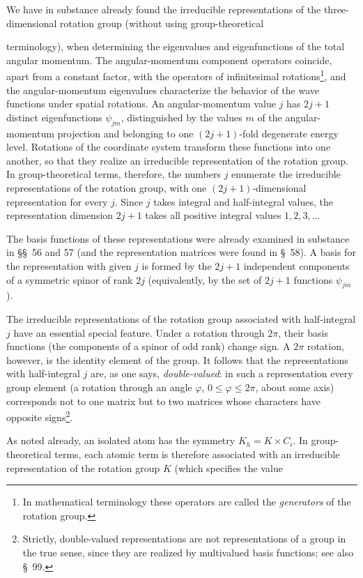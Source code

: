 We have in substance already found the irreducible representations of the three-dimensional rotation group (without using group-theoretical

terminology), when determining the eigenvalues and eigenfunctions of the total angular momentum. The angular-momentum component operators coincide, apart from a constant factor, with the operators of infinitesimal rotations\footnote{In mathematical terminology these operators are called the \emph{generators} of the rotation group.}, and the angular-momentum eigenvalues characterize the behavior of the wave functions under spatial rotations. An angular-momentum value $j$ has $2j+1$ distinct eigenfunctions $\psi_{jm}$, distinguished by the values $m$ of the angular-momentum projection and belonging to one $(2j+1)$-fold degenerate energy level. Rotations of the coordinate system transform these functions into one another, so that they realize an irreducible representation of the rotation group. In group-theoretical terms, therefore, the numbers $j$ enumerate the irreducible representations of the rotation group, with one $(2j+1)$-dimensional representation for every $j$. Since $j$ takes integral and half-integral values, the representation dimension $2j+1$ takes all positive integral values $1,2,3,\ldots$

The basis functions of these representations were already examined in substance in \S\S~56 and 57 (and the representation matrices were found in \S~58). A basis for the representation with given $j$ is formed by the $2j+1$ independent components of a symmetric spinor of rank $2j$ (equivalently, by the set of $2j+1$ functions $\psi_{jm}$).

The irreducible representations of the rotation group associated with half-integral $j$ have an essential special feature. Under a rotation through $2\pi$, their basis functions (the components of a spinor of odd rank) change sign. A $2\pi$ rotation, however, is the identity element of the group. It follows that the representations with half-integral $j$ are, as one says, \emph{double-valued}: in such a representation every group element (a rotation through an angle $\varphi$, $0\leqslant\varphi\leqslant2\pi$, about some axis) corresponds not to one matrix but to two matrices whose characters have opposite signs\footnote{Strictly, double-valued representations are not representations of a group in the true sense, since they are realized by multivalued basis functions; see also \S~99.}.

As noted already, an isolated atom has the symmetry $K_h=K\times C_i$. In group-theoretical terms, each atomic term is therefore associated with an irreducible representation of the rotation group $K$ (which specifies the value

